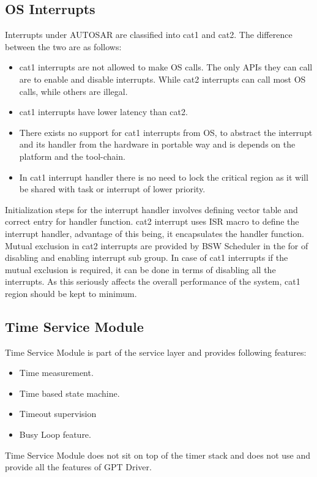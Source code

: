 \subsection{OS Interrupts}
Interrupts under AUTOSAR are classified into cat1 and cat2.
The difference between the two are as follows:
\begin{itemize}
	\item cat1 interrupts are not allowed to make OS calls. The only APIs they can call are to enable and disable interrupts. While cat2 interrupts can call most OS calls, while others are illegal.
	\item cat1 interrupts have lower latency than cat2.
	\item There exists no support for cat1 interrupts from OS, to abstract the interrupt and its handler from the hardware in portable way and is depends on the platform and the tool-chain.
	\item In cat1 interrupt handler there is no need to lock the critical region as it will be shared with task or interrupt of lower priority.
\end{itemize}
Initialization steps for the interrupt handler involves defining vector table and correct entry for handler function.
cat2 interrupt uses ISR macro to define the interrupt handler, advantage of this being, it encapsulates the handler function.
Mutual exclusion in cat2 interrupts are provided by BSW Scheduler in the for of disabling and enabling interrupt sub group.
In case of cat1 interrupts if the mutual exclusion is required, it can be done in terms of disabling all the interrupts. As this seriously affects the overall performance of the system, cat1 region should be kept to minimum.
\subsection{Time Service Module}
Time Service Module is part of the service layer and provides following features:
\begin{itemize}
	\item Time measurement.
	\item Time based state machine.
	\item Timeout supervision
	\item Busy Loop feature.
\end{itemize}
Time Service Module does not sit on top of the timer stack and does not use and provide all the features of GPT Driver.

